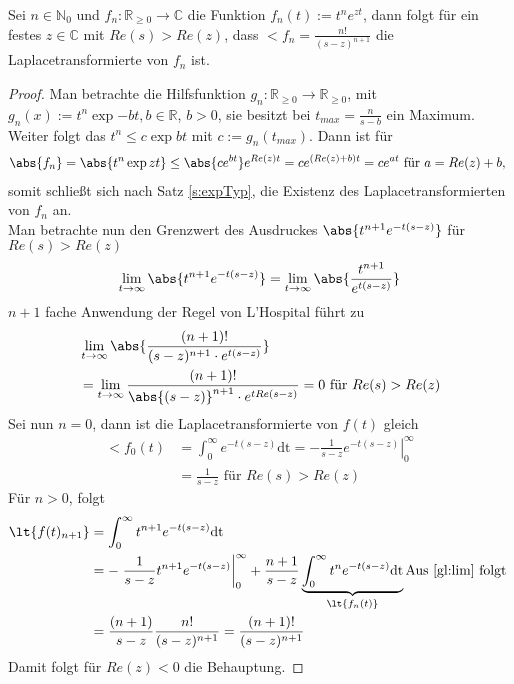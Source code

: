 \begin{satz}\label{LT:texp}Sei $n \in \mathbb{N}_0$ und $f_n: \mathbb{R}_{\geq {0}} \rightarrow \mathbb{C}$ die Funktion $f_n(t) := t^n e^{zt}$, dann folgt für ein festes $z \in \mathbb{C}$ mit $Re(s) > Re(z)$, dass $\lt{f_n} = \frac{n!}{(s-z)^{n+1}}$ die Laplacetransformierte von $f_n$ ist.
\begin{proof}
Man betrachte die Hilfsfunktion $g_n: \mathbb{R}_{\geq 0} \rightarrow \mathbb{R}_{\geq 0}$, mit $g_n(x):=t^n \exp{-bt}, b \in \mathbb{R}$, $b >0$, sie besitzt bei $t_{max}=\frac{n}{s-b}$ ein Maximum. Weiter folgt das $t^n \leq c \exp{bt}$ mit $c:=g_n(t_{max})$. Dann ist für 
\begin{align}
	\abs{f_n} = \abs{t^n \exp{zt}} \leq \abs{c e^{bt}} e^{Re(z)t} = c e^{(Re(z)+b)t} = c e^{at} \text{ für } a = Re(z) + b \text{, }
\end{align}
 somit schließt sich nach Satz \ref{s:expTyp}, die Existenz des Laplacetransformierten von $f_n$ an.\\
Man betrachte nun den Grenzwert des Ausdruckes $\abs{t^{n+1}e^{-t(s-z)}}$ für $Re(s) > Re(z)$
	\begin{align}
		\lim_{t \rightarrow \infty} \abs{t^{n+1} e^{-t(s-z)}} = \lim_{t \rightarrow \infty} \abs{\frac{t^{n+1}}{e^{t(s-z)}}}
	\end{align}
$n+1$ fache Anwendung der Regel von L'Hospital führt zu
	\begin{align}
		& \lim_{t\rightarrow \infty} \abs{\frac{(n+1)!}{(s-z)^{n+1}\cdot e^{t(s-z)}}} \\
		&=\lim_{t\rightarrow \infty} \frac{(n+1)!}{\abs{(s-z)}^{n+1}\cdot e^{t Re(s-z)}}		
		= 0 \text{ für } Re(s) > Re(z) \label{gl:lim}
	\end{align}
Sei nun $n=0$, dann ist die Laplacetransformierte von $f(t)$ gleich
\begin{align}
	\lt{f_0(t)} &= \int_0^{\infty} e^{-t(s-z)} \mathrm{dt} = - \left. \frac{1}{s-z} e^{-t(s-z)} \right\vert_0^{\infty} \\
					  &= \frac{1}{s-z} \text{ für } Re(s) > Re(z) 
\end{align}
Für $n > 0$, folgt
\begin{align}
	\lt{f(t)_{n+1}} &= \int_0^{\infty} t^{n+1} e^{-t(s-z)} \mathrm{dt} \\
	&= -\left.\frac{1}{s-z} t^{n+1} e^{-t(s-z)} \right\vert_0^{\infty} + \frac{n+1}{s-z} \underbrace{\int_0^{\infty} t^{n} e^{-t(s-z)}\mathrm{dt}}_{\lt{f_n(t)}} \text{Aus \ref{gl:lim} folgt } \\
	&= \frac{(n+1)}{s-z} \frac{n!}{(s-z)^{n+1}} = \frac{(n+1)!}{(s-z)^{n+1}}
\end{align}
Damit folgt für $Re(z) < 0$ die Behauptung.
\end{proof}
\end{satz}
